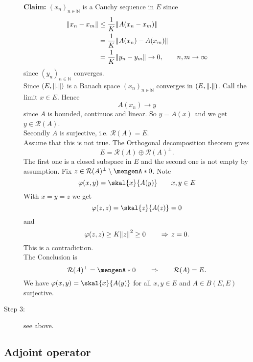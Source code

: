 \begin{beweis}
\begin{description}
		\textbf{Claim:} \text{    }$(x_n)_{n \in \mathbb{N}}$ is a Cauchy sequence in $E$ since
		\begin{align*}
			\norm{x_n-x_m} &\leq \frac{1}{K} \norm{A(x_n-x_m)} \\
			&= \frac{1}{K} \norm{A(x_n)- A(x_m)} \\
			&= \frac{1}{K} \norm{y_n -y_m} \to 0, \qquad n,m \to \infty
		\end{align*}
		since $(y_n)_{n \in \mathbb{N}}$ converges. \\
		Since $(E, \norm{.})$ is a Banach space $(x_n)_{n \in \mathbb{N}}$ converges in $(E, \norm{.})$. Call the limit $x \in E$. Hence
		\[
			A(x_n) \to y
		\]
		since $A$ is bounded, continuos and linear. So $y = A(x)$ and we get $y \in \mathcal{R}(A)$. \\
		Secondly $A$ is surjective, i.e. $\mathcal{R}(A)=E$. \\
		Assume that this is not true. The Orthogonal decomposition theorem gives
		\[
			E = \mathcal{R}(A) \oplus \mathcal{R}(A)^{\perp}.
		\]
		The first one is a closed subspace in $E$ and the second one is not empty by assumption. Fix $z \in \mathcal{R}(A)^{\perp} \setminus \set{0}$. Note 
		\[
			\varphi(x,y) = \skal{x}{A(y)} \qquad x,y \in E
		\]
		With $x = y = z$ we get
		\[
			\varphi(z,z) = \skal{z}{A(z)} = 0
		\]
		and 
		\[
			\varphi(z,z) \geq K \norm{z}^2 \geq 0 \qquad \Rightarrow  \,z=0.
		\]
		This is a contradiction. \\
		The Conclusion is 
		\[
			\mathcal{R}(A)^{\perp} = \set{0} \qquad \Rightarrow \qquad \mathcal{R}(A) = E.
		\]
		We have $\varphi(x,y) = \skal{x}{A(y)}$ for all $x,y \in E$ and $A \in B(E,E)$ surjective.
		\item[Step 3:] see above.
	\end{description}
\end{beweis}

\subsection{Adjoint operator} 
\label{sub:adjoint_operator}

